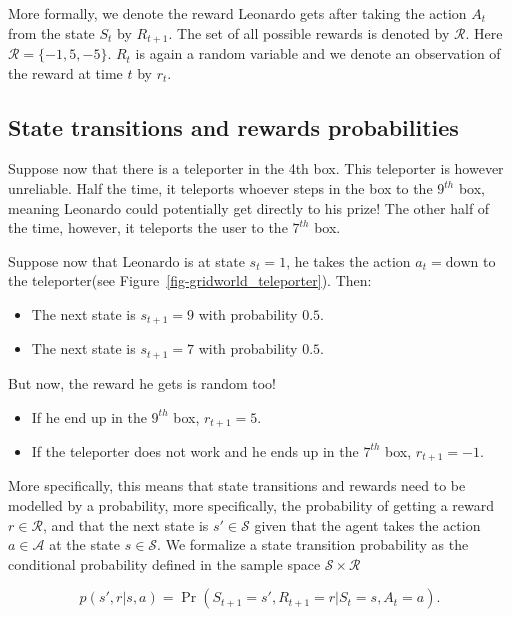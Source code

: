 \documentclass[
  letterpaper,
]{report}
\providecommand{\tightlist}{%
  \setlength{\itemsep}{0pt}\setlength{\parskip}{0pt}}\usepackage{longtable,booktabs,array}
\theoremstyle{definition}
\theoremstyle{plain}
\theoremstyle{definition}
\theoremstyle{remark}
\begin{document}
More formally, we denote the reward Leonardo gets after taking the
action \(A_t\) from the state \(S_t\) by \(R_{t+1}\). The set of all
possible rewards is denoted by \(\mathcal{R}\). Here
\(\mathcal{R} = \{-1,5,-5\}\). \(R_t\) is again a random variable and we
denote an observation of the reward at time \(t\) by \(r_t\).

\subsection{State transitions and rewards
probabilities}\label{state-transitions-and-rewards-probabilities}

Suppose now that there is a teleporter in the 4th box. This teleporter
is however unreliable. Half the time, it teleports whoever steps in the
box to the \(9^{th}\) box, meaning Leonardo could potentially get
directly to his prize! The other half of the time, however, it teleports
the user to the \(7^{th}\) box.

Suppose now that Leonardo is at state \(s_t=1\), he takes the action
\(a_t = \text{down}\) to the teleporter(see
Figure~\ref{fig-gridworld_teleporter}). Then:

\begin{itemize}
\tightlist
\item
  The next state is \(s_{t+1} = 9\) with probability \(0.5\).
\item
  The next state is \(s_{t+1} = 7\) with probability \(0.5\).
\end{itemize}

But now, the reward he gets is random too!

\begin{itemize}
\tightlist
\item
  If he end up in the \(9^{th}\) box, \(r_{t+1} = 5\).
\item
  If the teleporter does not work and he ends up in the \(7^{th}\) box,
  \(r_{t+1} = -1\).
\end{itemize}

More specifically, this means that state transitions and rewards need to
be modelled by a probability, more specifically, the probability of
getting a reward \(r\in\mathcal{R}\), and that the next state is
\(s'\in\mathcal{S}\) given that the agent takes the action
\(a\in\mathcal{A}\) at the state \(s\in\mathcal{S}\). We formalize a
state transition probability as the conditional probability defined in
the sample space \(\mathcal{S}\times \mathcal{R}\)

\[
p(s',r|s,a) = \Pr(S_{t+1} = s', R_{t+1} = r | S_t = s, A_t = a).
\]
\end{document}
